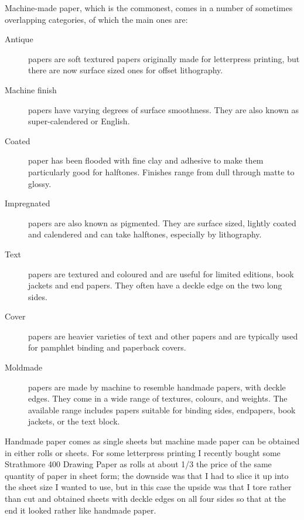 \documentclass[10pt,a4paper,extrafontsizes]{memoir}
\begin{document}

\begin{paracol}{2}
\switchEng
    Machine-made paper, which is the commonest, comes in a number of 
sometimes overlapping categories, of which the main ones are:
\begin{description}
\item[Antique] papers are soft textured papers originally
made for letterpress printing, but there are now surface sized ones for
offset lithography. 
\item[Machine finish] papers have varying degrees 
of surface smoothness. They are also known as 
super-calendered or 
English.
\item[Coated] paper has been flooded with fine clay and
adhesive to make them particularly good for halftones. Finishes range from 
dull through matte to glossy. 
\item[Impregnated] papers are also known as
pigmented. They are surface sized, lightly coated
and calendered and can take halftones, especially by lithography.
\item[Text] papers are textured and coloured and are 
useful for limited editions, book jackets and end papers. They often have 
a deckle edge on the two long sides.
\item[Cover] papers are heavier varieties of text and other
papers and are typically used for pamphlet binding and paperback covers.
\item[Moldmade] papers are made by machine to resemble
handmade papers, with deckle edges. They come in a wide range of textures,
colours, and weights. The available range includes papers suitable for
binding sides, endpapers, book jackets, or the text block.
\end{description}

    Handmade paper comes as single sheets but machine made paper can be 
obtained in either rolls or sheets. For some letterpress printing 
I recently bought some Strathmore 400
Drawing Paper as  rolls at about 1/3 the price of the
same quantity of paper in sheet form; the downside was that I had to slice 
it up into
the sheet size I wanted to use, but in this case the upside was that I tore
rather than cut and obtained sheets with deckle edges on all four sides
so that at the end it looked rather like handmade paper.


\end{paracol}
\end{document}

